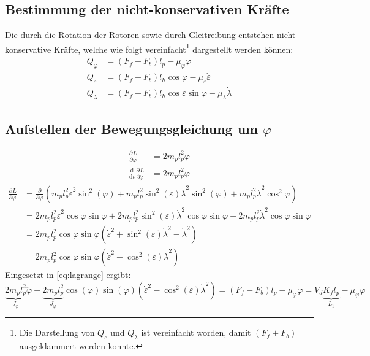 \documentclass[times, 10pt,twocolumn]{article}
\newcommand{\partiell}[3][]{\frac{\partial^{#1}#2}{\partial{#3}^{#1}}}
\newcommand{\diff}[3][]{\frac{\mathrm{d}^{#1}#2}{\mathrm{d}{#3}^{#1}}}
\begin{document}
	\subsection{Bestimmung der nicht-konservativen Kräfte}
	Die durch die Rotation der Rotoren sowie durch Gleitreibung entstehen nicht-konservative Kräfte, welche wie folgt vereinfacht\footnote{Die Darstellung von $Q_e$ und $Q_\lambda$ ist vereinfacht worden, damit $(F_f + F_b)$ ausgeklammert werden konnte.} dargestellt werden können:
	\begin{align}
	Q_\varphi &= (F_f - F_b)l_p - \mu_\varphi \dot{\varphi} \\
	Q_\varepsilon &= (F_f + F_b)l_h  \cos \varphi - \mu_\varepsilon \dot{\varepsilon}\\
	Q_\lambda &= (F_f + F_b)l_h \cos \varepsilon \sin \varphi - \mu_\lambda \dot{\lambda}
	\end{align}
	\subsection{Aufstellen der Bewegungsgleichung um $\varphi$}
	\begin{align}
	\partiell{L}{\dot{\varphi}} &= 2m_p l_p^2 \dot{\varphi}\\
	\diff{}{t} \partiell{L}{\dot{\varphi}} &= 2m_p l_p^2 \ddot{\varphi}
	\end{align}
	\begin{equation}
	\begin{split}
	\partiell{L}{\varphi} &= \partiell{}{\varphi} (m_p l_p^2 \dot{\varepsilon}^2 \sin^2 (\varphi) 
	+ m_p l_p^2 \sin^2 (\varepsilon) \dot{\lambda}^2 \sin^2 (\varphi)
	+ m_p l_p^2 \dot{\lambda}^2 \cos^2 \varphi)\\
	&= 2 m_p l_p^2 \dot{\varepsilon}^2 \cos \varphi \sin \varphi + 2 m_p l_p^2 \sin^2 (\varepsilon) \dot{\lambda}^2 \cos \varphi \sin \varphi 
	- 2 m_p l_p^2 \dot{\lambda}^2 \cos \varphi \sin \varphi\\
	&= 2 m_p l_p^2 \cos \varphi \sin \varphi (\dot{\varepsilon}^2+ \sin^2 (\varepsilon) \dot{\lambda}^2- \dot{\lambda}^2)\\
	&= 2 m_p l_p^2 \cos \varphi \sin \varphi (\dot{\varepsilon}^2- \cos^2 (\varepsilon) \dot{\lambda}^2)
	\end{split}
	\end{equation}
	Eingesetzt in \eqref{eq:lagrange} ergibt:
	\begin{equation}
	\underbrace{2m_p l_p^2}_{J_\varphi} \ddot{\varphi} -  \underbrace{2 m_p l_p^2}_{J_\varphi} \cos (\varphi) \sin (\varphi) (\dot{\varepsilon}^2- \cos^2 (\varepsilon) \dot{\lambda}^2) = (F_f - F_b)l_p - \mu_\varphi \dot{\varphi} = V_d \underbrace{K_f l_p}_{L_1} - \mu_\varphi \dot{\varphi}
	\end{equation}
\end{document}
